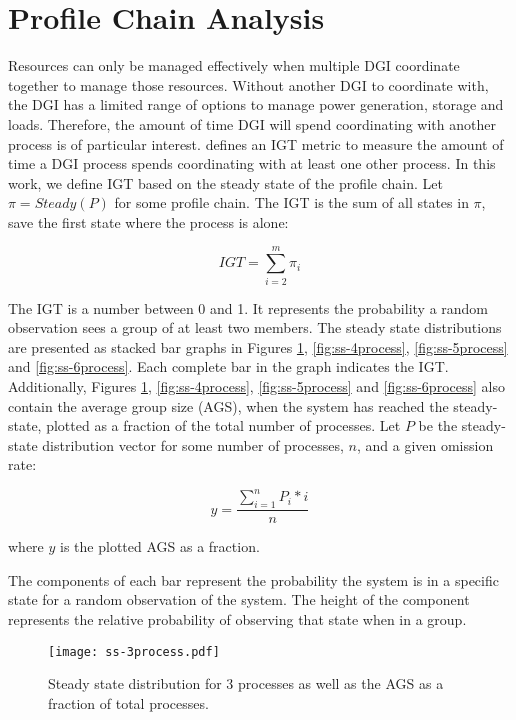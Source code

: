 \section{Profile Chain Analysis}

Resources can only be managed effectively when multiple \ac{DGI} coordinate together to manage those resources.
Without another DGI to coordinate with, the DGI has a limited range of options to manage power generation, storage and loads.
Therefore, the amount of time DGI will spend coordinating with another process is of particular interest.
\cite{CRITIS2012} defines an \ac{IGT} metric to measure the amount of time a DGI process spends coordinating with at least one other process.
In this work, we define \ac{IGT} based on the steady state of the profile chain.
Let $\pi=Steady(P)$ for some profile chain.
The \ac{IGT} is the sum of all states in $\pi$, save the first state where the process is alone:

\begin{equation} IGT = \sum_{i=2}^{m} \pi_i \end{equation}

The \ac{IGT} is a number between 0 and 1.
It represents the probability a random observation sees a group of at least two members.
The steady state distributions are presented as stacked bar graphs in Figures \ref{fig:ss-3process}, \ref{fig:ss-4process}, \ref{fig:ss-5process} and \ref{fig:ss-6process}.
Each complete bar in the graph indicates the \ac{IGT}.
Additionally, Figures \ref{fig:ss-3process}, \ref{fig:ss-4process}, \ref{fig:ss-5process} and \ref{fig:ss-6process} also contain the average group size (AGS), when the system has reached the steady-state, plotted as a fraction of the total number of processes.
Let $P$ be the steady-state distribution vector for some number of processes, $n$, and a given omission rate:

\begin{equation} y = \frac{\sum_{i=1}^{n} P_{i}*i}{n} \label{eq:ss-means} \end{equation}

where $y$ is the plotted \ac{AGS} as a fraction.

The components of each bar represent the probability the system is in a specific state for a random observation of the system.
The height of the component represents the relative probability of observing that state when in a group.

\begin{figure}
    \centering
    \texttt{[image: ss-3process.pdf]}
    \caption{Steady state distribution for 3 processes as well as the \ac{AGS} as a fraction of total processes.}
    \label{fig:ss-3process}
\end{figure}

